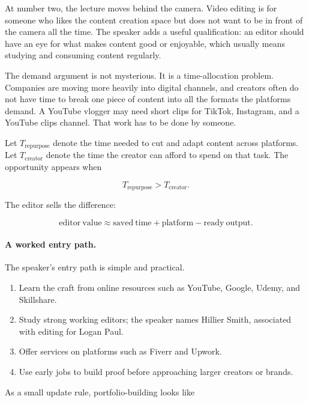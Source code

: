 At number two, the lecture moves behind the camera. Video editing is for someone who likes the content creation space but does not want to be in front of the camera all the time. The speaker adds a useful qualification: an editor should have an eye for what makes content good or enjoyable, which usually means studying and consuming content regularly.

The demand argument is not mysterious. It is a time-allocation problem. Companies are moving more heavily into digital channels, and creators often do not have time to break one piece of content into all the formats the platforms demand. A YouTube vlogger may need short clips for TikTok, Instagram, and a YouTube clips channel. That work has to be done by someone.

Let \(T_{\mathrm{repurpose}}\) denote the time needed to cut and adapt content across platforms. Let \(T_{\mathrm{creator}}\) denote the time the creator can afford to spend on that task. The opportunity appears when

\begin{equation}
T_{\mathrm{repurpose}} > T_{\mathrm{creator}} .
\end{equation}

The editor sells the difference:

\begin{equation}
\mathrm{editor\ value}
\approx
\mathrm{saved\ time}
+
\mathrm{platform-ready\ output}.
\end{equation}

\paragraph{A worked entry path.}
The speaker's entry path is simple and practical.

\begin{enumerate}
\item Learn the craft from online resources such as YouTube, Google, Udemy, and Skillshare.
\item Study strong working editors; the speaker names Hillier Smith, associated with editing for Logan Paul.
\item Offer services on platforms such as Fiverr and Upwork.
\item Use early jobs to build proof before approaching larger creators or brands.
\end{enumerate}

As a small update rule, portfolio-building looks like

